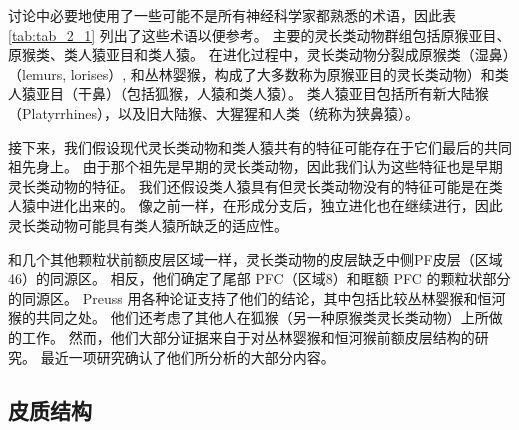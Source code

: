 讨论中必要地使用了一些可能不是所有神经科学家都熟悉的术语，因此表 \ref{tab:tab_2_1} 列出了这些术语以便参考。
主要的灵长类动物群组包括原猴亚目、原猴类、类人猿亚目和类人猿。
在进化过程中，灵长类动物分裂成原猴类（湿鼻）（lemurs, lorises）, 和丛林婴猴，构成了大多数称为原猴亚目的灵长类动物）和类人猿亚目（干鼻）（包括狐猴，人猿和类人猿）。
类人猿亚目包括所有新大陆猴（Platyrrhines），以及旧大陆猴、大猩猩和人类（统称为狭鼻猿）。


接下来，我们假设现代灵长类动物和类人猿共有的特征可能存在于它们最后的共同祖先身上。
由于那个祖先是早期的灵长类动物，因此我们认为这些特征也是早期灵长类动物的特征。
我们还假设类人猿具有但灵长类动物没有的特征可能是在类人猿中进化出来的。
像之前一样，在形成分支后，独立进化也在继续进行，因此灵长类动物可能具有类人猿所缺乏的适应性。


和几个其他颗粒状前额皮层区域一样\cite{Preuss1991a}，灵长类动物的皮层缺乏中侧PF皮层（区域46）的同源区。
相反，他们确定了尾部 PFC（区域8）和眶额 PFC 的颗粒状部分的同源区。
Preuss 用各种论证支持了他们的结论，其中包括比较丛林婴猴和恒河猴的共同之处\cite{preuss1991ipsilateral}。
他们还考虑了其他人在狐猴（另一种原猴类灵长类动物）上所做的工作。
然而，他们大部分证据来自于对丛林婴猴和恒河猴前额皮层结构的研究。
最近一项研究确认了他们所分析的大部分内容\cite{wong2010architectonic}。


\subsection{皮质结构}

